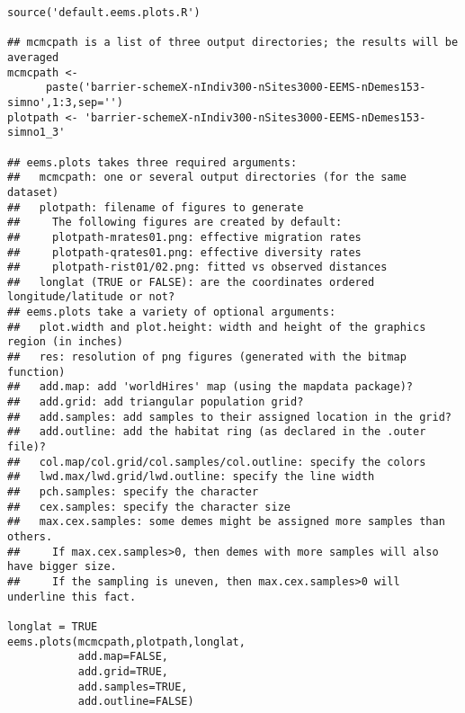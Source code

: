 \documentclass[a4paper,10pt,DIV=15,mpinclude=true]{scrartcl}
\begin{document}
\begin{verbatim}
source('default.eems.plots.R')

## mcmcpath is a list of three output directories; the results will be averaged
mcmcpath <- 
      paste('barrier-schemeX-nIndiv300-nSites3000-EEMS-nDemes153-simno',1:3,sep='')
plotpath <- 'barrier-schemeX-nIndiv300-nSites3000-EEMS-nDemes153-simno1_3'

## eems.plots takes three required arguments:
##   mcmcpath: one or several output directories (for the same dataset)
##   plotpath: filename of figures to generate
##     The following figures are created by default:
##     plotpath-mrates01.png: effective migration rates
##     plotpath-qrates01.png: effective diversity rates
##     plotpath-rist01/02.png: fitted vs observed distances
##   longlat (TRUE or FALSE): are the coordinates ordered longitude/latitude or not?
## eems.plots take a variety of optional arguments:
##   plot.width and plot.height: width and height of the graphics region (in inches)                                      
##   res: resolution of png figures (generated with the bitmap function)                        
##   add.map: add 'worldHires' map (using the mapdata package)?                                 
##   add.grid: add triangular population grid?                                                  
##   add.samples: add samples to their assigned location in the grid?                           
##   add.outline: add the habitat ring (as declared in the .outer file)?                        
##   col.map/col.grid/col.samples/col.outline: specify the colors                               
##   lwd.max/lwd.grid/lwd.outline: specify the line width                                       
##   pch.samples: specify the character                                                         
##   cex.samples: specify the character size                                                    
##   max.cex.samples: some demes might be assigned more samples than others.                    
##     If max.cex.samples>0, then demes with more samples will also have bigger size.           
##     If the sampling is uneven, then max.cex.samples>0 will underline this fact.

longlat = TRUE                                              
eems.plots(mcmcpath,plotpath,longlat,
           add.map=FALSE,
           add.grid=TRUE,
           add.samples=TRUE,
           add.outline=FALSE)
\end{verbatim}
\end{document}
